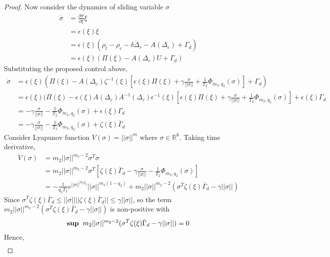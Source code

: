 \documentclass[]{article}
\theoremstyle{remark}
\theoremstyle{definition}
\begin{document}
\begin{proof}
	Now consider the dynamics of sliding variable $ \sigma $ 
	\begin{align}
		\dot \sigma  &= \frac{\partial \sigma}{\partial \xi}\dot \xi \\
		& = \epsilon(\xi)\dot \xi \\
		& = \epsilon(\xi)(\rho_t-\rho_c-\delta\dot\Delta_r-A(\Delta_c)+\Gamma_d)\\
		&= \epsilon(\xi)(\Pi(\xi)-A(\Delta_c)U+ \Gamma_d) 
	\end{align}
Substituting the proposed control above,
\begin{align}
	\dot \sigma &= \epsilon(\xi)(\Pi(\xi)-A(\Delta_c)\zeta^{-1}(\xi)\left[\epsilon(\xi)\Pi(\xi)+ \gamma \frac{\sigma}{||\sigma||} + \frac{1}{T_2}\Phi_{m_2,q_2}(\sigma)\right]+ \Gamma_d) \\
	& = \epsilon(\xi)(\Pi(\xi) - \epsilon(\xi)A(\Delta_c)A^{-1}(\Delta_c)\epsilon^{-1}(\xi)\left[\epsilon(\xi)\Pi(\xi)+ \gamma \frac{\sigma}{||\sigma||} + \frac{1}{T_2}\Phi_{m_2,q_2}(\sigma)\right]+ \epsilon(\xi)\Gamma_d \\
	& = -\gamma \frac{\sigma}{||\sigma||} - \frac{1}{T_2}\Phi_{m_2,q_2}(\sigma)+ \epsilon(\xi)\Gamma_d \\
	& = -\gamma \frac{\sigma}{||\sigma||} - \frac{1}{T_2}\Phi_{m_2,q_2}(\sigma)+ \zeta(\xi)\bar\Gamma_d
\end{align}
Consider Lyapunov function $ V(\sigma) = ||\sigma||^m $ where $ \sigma\in \mathbb{R}^6$.
Taking time derivative,
\begin{align}
	\dot V(\sigma) &= m_2||\sigma||^{m_2-2}\sigma^T\dot \sigma \\
	& = m_2||\sigma||^{m_2-2}\sigma^T\left[\zeta(\xi)\bar\Gamma_d-\gamma \frac{\sigma}{||\sigma||} - \frac{1}{T_2}\Phi_{m_2,q_2}(\sigma)\right]\\
	& = -\frac{1}{q_2T_2}e^{||\sigma||^{m_2q_2}}||\sigma||^{m_2(1-q_2)} + m_2||\sigma||^{m_2-2}(\sigma^T\zeta(\xi)\bar\Gamma_d -\gamma||\sigma||)
	\end {align}
	Since $\sigma^T\zeta(\xi)\bar\Gamma_d\leq ||\sigma||||\zeta(\xi)\bar\Gamma_d||\leq \gamma||\sigma||$, so the term $m_2||\sigma||^{m_2-2}(\sigma^T\zeta(\xi)\bar\Gamma_d -\gamma||\sigma||)$ is non-positive with 
	\begin{align}
		\textbf{sup} \hspace{2mm}m_2||\sigma||^{m_2-2}(\sigma^T\zeta(\xi)\bar\Gamma_d -\gamma||\sigma||) = 0 
	\end{align}
	Hence,
	\begin{align}

\end{align}
\end{proof}
\end{document}

